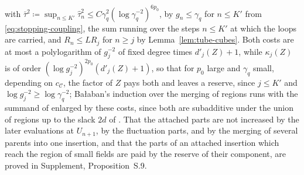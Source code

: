 \documentclass[11pt]{preprint}
\numberwithin{equation}{section}
\theoremstyle{definition}
\theoremstyle{remark}
\theoremstyle{plain}
\begin{document}
with $\bar\tau^2 \coloneqq \sup_{n \leq K'}\hat\tau_n^2 \leq C\gamma_q^2(\log\gamma_q^{-2})^{6p_0}$, by $g_n \leq \gamma_q$ for $n \leq K'$ from \eqref{eq:stopping-coupling}, the sum running over the steps $n \leq K'$ at which the loops are carried, and $R_n \leq LR_j$ for $n \geq j$ by Lemma~\ref{lem:tube-cubes}. Both costs are at most a polylogarithm of $g_j^{-2}$ of fixed degree times $d'_j(Z) + 1$, while $\kappa_j(Z)$ is of order $(\log g_j^{-2})^{2p_0}(d'_j(Z) + 1)$, so that for $p_0$ large and $\gamma_q$ small, depending on $c_{\mathcal C}$, the factor of $Z$ pays both and leaves a reserve, since $j \leq K'$ and $\log g_j^{-2} \geq \log\gamma_q^{-2}$; Ba{\l}aban's induction over the merging of regions \cite[pp.~384--389]{BalabanLFR2} runs with the summand of \cite[(1.80)]{BalabanLFR2} enlarged by these costs, since both are subadditive under the union of regions up to the slack $2d$ of \cite[p.~386]{BalabanLFR2}. That the attached parts are not increased by the later evaluations at $U_{n+1}$, by the fluctuation parts, and by the merging of several parents into one insertion, and that the parts of an attached insertion which reach the region of small fields are paid by the reserve of their component, are proved in Supplement, Proposition~S.9.
\end{document}
